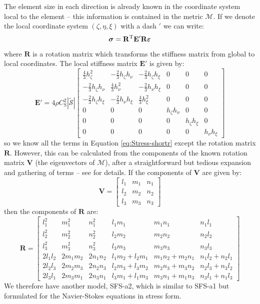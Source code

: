 The element size in each direction is already known in the
coordinate system local to the element -- this information is
contained in the metric $\mathcal{M}$. If we denote the local
coordinate system $(\zeta,\eta,\xi)$ with a dash $'$ we can write:
\begin{equation}
\mbox{\boldmath $\sigma$} = \mathbf{R}^{\textrm{T}} \mathbf{E}'
\mathbf{R} \mbox{\boldmath $\epsilon$} \label{eq:Stress-shortr}
\end{equation}
where $\mathbf{R}$ is a rotation matrix which transforms the
stiffness matrix from global to local coordinates. The local
stiffness matrix $\mathbf{E}'$ is given by:
\begin{equation}
\mathbf{E}' = 4\rho C_{\textrm{S}}^2 |\tilde{\mathcal{S}}|
\begin{bmatrix}
\frac{4}{3}h_\zeta^2 & -\frac{2}{3}h_\zeta h_\nu &
-\frac{2}{3}h_\zeta h_\xi & 0 & 0 & 0 \\
-\frac{2}{3}h_\zeta h_\nu & \frac{4}{3}h_\nu^2 &
-\frac{2}{3}h_\nu h_\xi & 0 & 0 & 0 \\
-\frac{2}{3}h_\zeta h_\xi & -\frac{2}{3}h_\nu h_\xi &
\frac{4}{3}h_\xi^2 & 0 & 0 & 0 \\
0 & 0 & 0 & h_\zeta h_\nu & 0 & 0 \\
0 & 0 & 0 & 0 & h_\zeta h_\xi & 0 \\
0 & 0 & 0 & 0 & 0 & h_\nu h_\xi \end{bmatrix}
\end{equation}
so we know all the terms in Equation \ref{eq:Stress-shortr} except
the rotation matrix $\mathbf{R}$. However, this can be calculated
from the components of the known rotation matrix $\mathbf{V}$ (the
eigenvectors of $\mathcal{M}$), after a straightforward but
tedious expansion and gathering of terms -- see \cite{CMP89} for
details. If the components of $\mathbf{V}$ are given by:
\begin{equation}
\mathbf{V}=\left[ \begin{array}{ccc}
l_1 & m_1 & n_1 \\
l_2 & m_2 & n_2 \\
l_3 & m_3 & n_3
\end{array} \right]
\end{equation}
then the components of $\mathbf{R}$ are: {\small
\begin{equation}
\mathbf{R}= \begin{bmatrix}
l_1^2 & m_1^2 & n_1^2 & l_1 m_1 & m_1 n_1 & n_1 l_1 \\
l_2^2 & m_2^2 & n_2^2 & l_2 m_2 & m_2 n_2 & n_2 l_2 \\
l_3^2 & m_3^2 & n_3^2 & l_3 m_3 & m_3 n_3 & n_3 l_3 \\
2l_1 l_2 & 2m_1 m_2 & 2n_1 n_2 &
l_1m_2+l_2m_1 & m_1n_2+m_2n_1 & n_1l_2+n_2l_1 \\
2l_2 l_3 & 2m_2 m_3 & 2n_2 n_3 &
l_2m_3+l_3m_2 & m_2n_3+m_3n_2 & n_2l_3+n_3l_2 \\
2l_3 l_1 & 2m_3 m_1 & 2n_3 n_1 & l_3m_1+l_1m_3 & m_3n_1+m_1n_3 &
n_3l_1+n_1l_3
\end{bmatrix}
\end{equation}
}
We therefore have another model, SFS-a2, which is similar to
SFS-a1 but formulated for the Navier-Stokes equations in stress
form.

